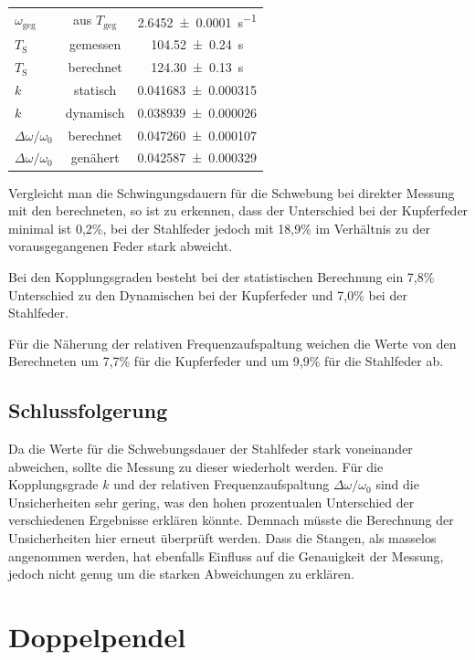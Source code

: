 \documentclass[11pt,a4paper,titlepage, ngerman]{article}
\begin{document}
\begin{table}[ht]
\begin{tabular}{l|S|S}
					{$\omega_\text{geg}$} & {aus $T_\text{geg}$} & \SI{2,6452 +- 0,0001}{\s^{-1}}\\
					{$T_\text{S}$} & {gemessen} & \SI{104,52 +- 0,24}{\second}\\
					{$T_\text{S}$} & {berechnet} & \SI{124,30 +- 0,13}{\second}\\
					{$k$} & {statisch} & \SI{0,041683 +- 0,000315}{}\\
					{$k$} & {dynamisch} & \SI{0,038939 +- 0,000026}{}\\
					{$\Delta\omega / \omega_0$} & {berechnet} & \SI{0,047260 +- 0,000107}{}\\
					{$\Delta\omega / \omega_0$} & {genähert} & \SI{0,042587 +- 0,000329}{}\\
				\end{tabular}
			\end{table}
			
			Vergleicht man die Schwingungsdauern für die Schwebung bei direkter Messung mit den berechneten, so ist zu erkennen, dass der Unterschied bei der Kupferfeder minimal ist 0,2\%, bei der Stahlfeder jedoch mit 18,9\% im Verhältnis zu der vorausgegangenen Feder stark abweicht.
			
			Bei den Kopplungsgraden besteht bei der statistischen Berechnung ein 7,8\% Unterschied zu den Dynamischen bei der Kupferfeder und 7,0\% bei der Stahlfeder.
			
			Für die Näherung der relativen Frequenzaufspaltung weichen die Werte von den Berechneten um 7,7\% für die Kupferfeder und um 9,9\% für die Stahlfeder ab.
			
		\subsection{Schlussfolgerung}
			
			Da die Werte für die Schwebungsdauer der Stahlfeder stark voneinander abweichen, sollte die Messung zu dieser wiederholt werden. Für die Kopplungsgrade $k$ und der relativen Frequenzaufspaltung $\Delta\omega / \omega_0$ sind die Unsicherheiten sehr gering, was den hohen prozentualen Unterschied der verschiedenen Ergebnisse erklären könnte. Demnach müsste die Berechnung der Unsicherheiten hier erneut überprüft werden. Dass die Stangen, als masselos angenommen werden, hat ebenfalls Einfluss auf die Genauigkeit der Messung, jedoch nicht genug um die starken Abweichungen zu erklären.
			
	\section{Doppelpendel}
	
\end{document}
